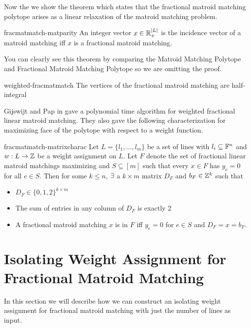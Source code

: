 Now the we show the theorem  which states that the fractional matroid matching polytope arises
as a linear relaxation of the matroid matching problem. 
\begin{Theorem}{\cite[Theoerm 2.1]{fraclinmat}}{fracmatmatch-matparity}
	An integer vector $x\in\mathbb{R}^{|L|}_+$ is the incidence  vector of a matroid matching iff $x$ is a fractional matroid matching. 
\end{Theorem}
You can clearly see this theorem by comparing the Matroid Matching Polytope and Fractional Matroid Matching Polytope so we are omitting the proof.
\begin{Theorem}{\cite[Theorem 1]{weightedfracmatmatch}}{weighted-fracmatmatch}
	The vertices of the fractional matroid matching are half-integral
\end{Theorem}
Gijswijt and Pap in \cite{weightedfracmatmatch} gave a polynomial time algorithm for weighted fractional linear matroid matching. They also gave the following characterization for maximizing face of the polytope with respect to a weight function.
\begin{Theorem}{\cite[Prood of Theorem 1]{weightedfracmatmatch}}{fracmatmatch-matrixcharac}
	Let $L=\{l_1,\dots, l_m\}$ be a set of lines with $l_i\subseteq \mathbb{F}^n$ and $w:L\to \mathbb{Z}$ be a weight assignment on $L$. Let $F$ denote the set of fractional linear matroid matchings maximizing and $S\subseteq [m]$ such that every $x\in F$ has $y_e=0$ for all $e\in S$. Then for some $k\leq n$, $\exists$ a $k\times m$ matrix $D_F$ and $b_F\in \mathbb{Z}^k$ such that \begin{itemize}
		\item $D_F\in\{0,1,2\}^{k\times m}$
		\item The sum of entries in any column of $D_F$ is exactly 2
		\item A fractional matroid matching $x$ is in $F$ iff $y_e=0$ for $e\in S$ and $D_F=x=b_F$.
	\end{itemize}
\end{Theorem}
\section{Isolating Weight Assignment for Fractional Matroid Matching}
In this section we will describe how we can construct an isolating weight assignment for fractional matroid matching with just the number of lines as input.

